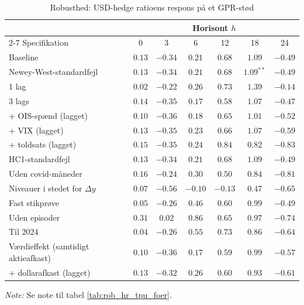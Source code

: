 \begin{table}[H]
\centering
\caption{Robusthed: USD-hedge ratioens respons på et GPR-stød}
\label{tab:rob_hr_gpr}
\begin{threeparttable}
\begin{tabular}{lcccccc}
\toprule
 & \multicolumn{6}{c}{Horisont $h$} \\
\cmidrule(lr){2-7}
Specifikation & 0 & 3 & 6 & 12 & 18 & 24 \\
\midrule
Baseline & $0.13$ & $-0.34$ & $0.21$ & $0.68$ & $1.09$ & $-0.49$ \\
Newey-West-standardfejl & $0.13$ & $-0.34$ & $0.21$ & $0.68$ & $1.09^{**}$ & $-0.49$ \\
1 lag & $0.02$ & $-0.22$ & $0.26$ & $0.73$ & $1.39$ & $-0.14$ \\
3 lags & $0.14$ & $-0.35$ & $0.17$ & $0.58$ & $1.07$ & $-0.47$ \\
+ OIS-spænd (lagget) & $0.10$ & $-0.36$ & $0.18$ & $0.65$ & $1.01$ & $-0.52$ \\
+ VIX (lagget) & $0.13$ & $-0.35$ & $0.23$ & $0.66$ & $1.07$ & $-0.59$ \\
+ toldsats (lagget) & $0.15$ & $-0.35$ & $0.24$ & $0.84$ & $0.82$ & $-0.83$ \\
HC1-standardfejl & $0.13$ & $-0.34$ & $0.21$ & $0.68$ & $1.09$ & $-0.49$ \\
Uden covid-måneder & $0.16$ & $-0.24$ & $0.30$ & $0.50$ & $0.84$ & $-0.81$ \\
Niveauer i stedet for $\Delta y$ & $0.07$ & $-0.56$ & $-0.10$ & $-0.13$ & $0.47$ & $-0.65$ \\
Fast stikprøve & $0.05$ & $-0.26$ & $0.46$ & $0.60$ & $0.99$ & $-0.49$ \\
Uden episoder & $0.31$ & $0.02$ & $0.86$ & $0.65$ & $0.97$ & $-0.74$ \\
Til 2024 & $0.04$ & $-0.26$ & $0.55$ & $0.73$ & $0.86$ & $-0.64$ \\
Værdieffekt (samtidigt aktieafkast) & $0.10$ & $-0.36$ & $0.17$ & $0.59$ & $0.99$ & $-0.57$ \\
+ dollarafkast (lagget) & $0.13$ & $-0.32$ & $0.26$ & $0.60$ & $0.93$ & $-0.61$ \\
\bottomrule
\end{tabular}
\begin{tablenotes}[flushleft]\footnotesize
\item \textit{Note:} Se note til tabel \ref{tab:rob_hr_tpu_foer}.
\end{tablenotes}
\end{threeparttable}
\end{table}